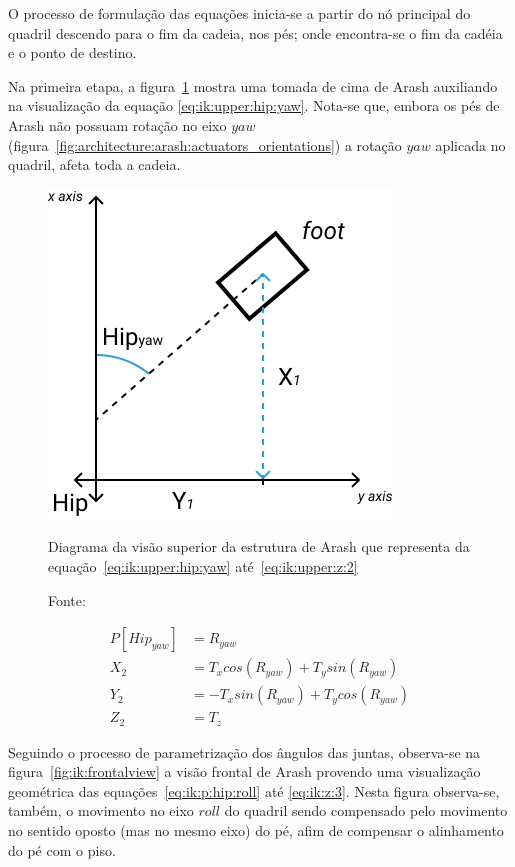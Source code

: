 O processo de formulação das equações inicia-se a partir do nó principal do quadril descendo para o fim da cadeia, nos pés; onde encontra-se o fim da cadéia e o ponto de destino.

Na primeira etapa, a figura~\ref{fig:ik:upperview} mostra uma tomada de cima de Arash auxiliando na visualização da equação \ref{eq:ik:upper:hip:yaw}. Nota-se que, embora os pés de Arash não possuam rotação no eixo $yaw$ (figura~\ref{fig:architecture:arash:actuators_orientations}) a rotação $yaw$ aplicada no quadril, afeta toda a cadeia.

\begin{figure}[htb]
	\centering
	\includegraphics[scale=1.5]{imagens/svg/inverse-kinematics-upperview}
	\caption{Diagrama da visão superior da estrutura de Arash que representa da equação~\ref{eq:ik:upper:hip:yaw} até~\ref{eq:ik:upper:z:2}}
	\caption*{Fonte: \cite{karimionline}}
	\label{fig:ik:upperview}
\end{figure}

\begin{align}
	P[Hip_{yaw}] &= R_{yaw}                             \label{eq:ik:upper:hip:yaw}  \\
	         X_2 &= T_x cos(R_{yaw}) + T_y sin(R_{yaw})  \label{eq:ik:upper:x:2}      \\
	         Y_2 &= -T_x sin(R_{yaw}) + T_ycos(R_{yaw})   \label{eq:ik:upper:y:2}      \\
	         Z_2 &= T_z                                    \label{eq:ik:upper:z:2}
\end{align}

Seguindo o processo de parametrização dos ângulos das juntas, observa-se na figura~\ref{fig:ik:frontalview} a visão frontal de Arash provendo uma visualização geométrica das equações~\ref{eq:ik:p:hip:roll} até \ref{eq:ik:z:3}. Nesta figura observa-se, também, o movimento no eixo $roll$ do quadril sendo compensado pelo movimento no sentido oposto (mas no mesmo eixo) do pé, afim de compensar o alinhamento do pé com o piso.

